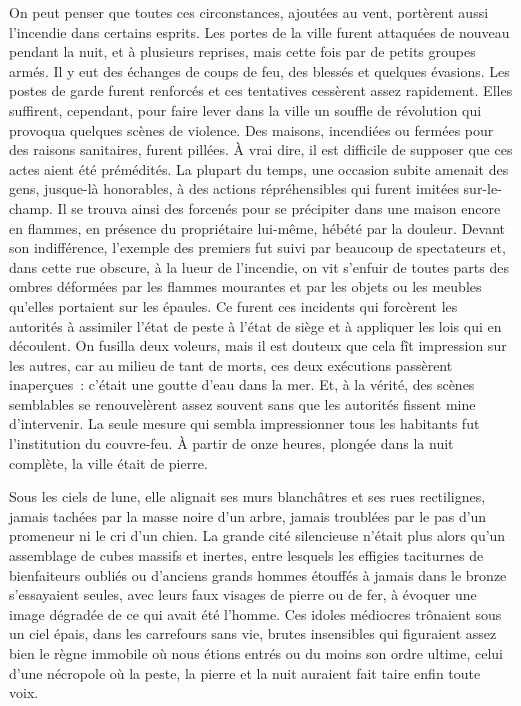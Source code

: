 \documentclass[french,twoside]{book} %
\begin{document}
On peut penser que toutes ces circonstances, ajoutées au vent, portèrent aussi l’incendie dans certains esprits. Les portes de la ville furent attaquées de nouveau pendant la nuit, et à plusieurs reprises, mais cette fois par de petits groupes armés. Il y eut des échanges de coups de feu, des blessés et quelques évasions. Les postes de garde furent renforcés et ces tentatives cessèrent assez rapidement. Elles suffirent, cependant, pour faire lever dans la ville un souffle de révolution qui provoqua quelques scènes de violence. Des maisons, incendiées ou fermées pour des raisons sanitaires, furent pillées. À vrai dire, il est difficile de supposer que ces actes aient été prémédités. La plupart du temps, une occasion subite amenait des gens, jusque-là honorables, à des actions répréhensibles qui furent imitées sur-le-champ. Il se trouva ainsi des forcenés pour se précipiter dans une maison encore en flammes, en présence du propriétaire lui-même, hébété par la douleur. Devant son indifférence, l’exemple des premiers fut suivi par beaucoup de spectateurs et, dans cette rue obscure, à la lueur de l’incendie, on vit s’enfuir de toutes parts des ombres déformées par les flammes mourantes et par les objets ou les meubles qu’elles portaient sur les épaules. Ce furent ces incidents qui forcèrent les autorités à assimiler l’état de peste à l’état de siège et à appliquer les lois qui en découlent. On fusilla deux voleurs, mais il est douteux que cela fît impression sur les autres, car au milieu de tant de morts, ces deux exécutions passèrent inaperçues : c’était une goutte d’eau dans la mer. Et, à la vérité, des scènes semblables se renouvelèrent assez souvent sans que les autorités fissent mine d’intervenir. La seule mesure qui sembla impressionner tous les habitants fut l’institution du couvre-feu. À partir de onze heures, plongée dans la nuit complète, la ville était de pierre.\par
Sous les ciels de lune, elle alignait ses murs blanchâtres et ses rues rectilignes, jamais tachées par la masse noire d’un arbre, jamais troublées par le pas d’un promeneur ni le cri d’un chien. La grande cité silencieuse n’était plus alors qu’un assemblage de cubes massifs et inertes, entre lesquels les effigies taciturnes de bienfaiteurs oubliés ou d’anciens grands hommes étouffés à jamais dans le bronze s’essayaient seules, avec leurs faux visages de pierre ou de fer, à évoquer une image dégradée de ce qui avait été l’homme. Ces idoles médiocres trônaient sous un ciel épais, dans les carrefours sans vie, brutes insensibles qui figuraient assez bien le règne immobile où nous étions entrés ou du moins son ordre ultime, celui d’une nécropole où la peste, la pierre et la nuit auraient fait taire enfin toute voix.
\end{document}

